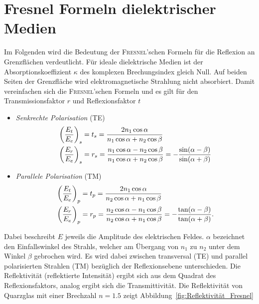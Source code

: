 \documentclass[a4paper,twoside,final]{article}
\begin{document}
\section{Fresnel Formeln dielektrischer Medien}
Im Folgenden wird die Bedeutung der \textsc{Fresnel}'schen Formeln für die Reflexion an Grenzflächen verdeutlicht. Für ideale dielektrische Medien ist der Absorptionskoeffizient $\kappa$ des komplexen Brechungsindex gleich Null. Auf beiden Seiten der Grenzfläche wird elektromagnetische Strahlung nicht absorbiert. Damit vereinfachen sich die \textsc{Fresnel}'schen Formeln und es gilt für den Transmissionsfaktor $r$ und Reflexionsfaktor $t$~\cite{Demtröder2}
\begin{itemize}
  \item \emph{Senkrechte Polarisation} (TE)
  \begin{align}
    \qty(\frac{E_t}{E_e})_s &= t_s = \frac{2 n_1 \cos \alpha}{n_1 \cos\alpha + n_2 \cos \beta}\\
    \qty(\frac{E_r}{E_e})_s &= r_s = \frac{n_1 \cos\alpha - n_2 \cos\beta}{n_1 \cos\alpha + n_2 \cos \beta} = -\frac{\sin(\alpha -\beta)}{\sin(\alpha + \beta)}
  \end{align}
  \item \emph{Parallele Polarisation} (TM)
  \begin{align}
    \qty(\frac{E_t}{E_e})_p &= t_p = \frac{2 n_1 \cos \alpha}{n_2 \cos\alpha + n_1 \cos \beta}\\
    \qty(\frac{E_r}{E_e})_p &= r_p = \frac{n_2 \cos\alpha - n_1 \cos\beta}{n_2 \cos\alpha + n_1 \cos \beta} = -\frac{\tan(\alpha -\beta)}{\tan(\alpha + \beta)}.\label{eqn:Parallele_Polarisation}
  \end{align}
\end{itemize}
Dabei beschreibt $E$ jeweils die Amplitude des elektrischen Feldes. $\alpha$ bezeichnet den Einfallswinkel des Strahls, welcher am Übergang von $n_1$ zu $n_2$ unter dem Winkel $\beta$ gebrochen wird.
Es wird dabei zwischen transversal (TE) und parallel polarisierten Strahlen (TM) bezüglich der Reflexionsebene unterschieden. Die Reflektivität (reflektierte Intensität) ergibt sich aus dem Quadrat des Reflexionsfaktors, analog ergibt sich die Transmittivität. Die Reflektivität von Quarzglas mit einer Brechzahl $n = 1.5$ zeigt Abbildung~\ref{fig:Reflektivität_Fresnel}


\end{document}
